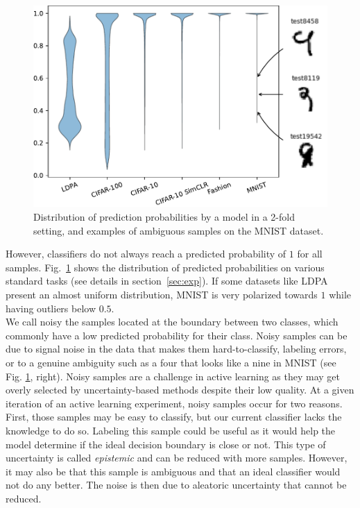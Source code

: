 \documentclass[runningheads]{llncs}
\begin{document}
\begin{figure}[htp]
  \centering
  \includegraphics[width=\textwidth]{images/score_distribution.pdf}%

  \caption{Distribution of prediction probabilities by a model in a 2-fold setting, and examples of ambiguous samples on the MNIST dataset.}
  \label{fig:ambiguous}
  
\end{figure}

However, classifiers do not always reach a predicted probability of $1$ for all samples. Fig.~\ref{fig:ambiguous} shows the distribution of predicted probabilities on various standard tasks (see details in section~\ref{sec:exp}). If some datasets like LDPA present an almost uniform distribution, MNIST is very polarized towards $1$ while having outliers below $0.5$.\\

We call noisy the samples located at the boundary between two classes, which commonly have a low predicted probability for their class. Noisy samples can be due to signal noise in the data that makes them hard-to-classify, labeling errors, or to a genuine ambiguity such as a four that looks like a nine in MNIST (see Fig. \ref{fig:ambiguous}, right). Noisy samples are a challenge in active learning as they may get overly selected by uncertainty-based methods despite their low quality. At a given iteration of an active learning experiment, noisy samples occur for two reasons. First, those samples may be easy to classify, but our current classifier lacks the knowledge to do so. Labeling this sample could be useful as it would help the model determine if the ideal decision boundary is close or not. This type of uncertainty is called \textit{epistemic} and can be reduced with more samples. However, it may also be that this sample is ambiguous and that an ideal classifier would not do any better. The noise is then due to aleatoric uncertainty that cannot be reduced.
\end{document}
